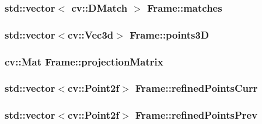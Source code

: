 \subsubsection[{\texorpdfstring{matches}{matches}}]{\setlength{\rightskip}{0pt plus 5cm}std\+::vector$<$ cv\+::\+D\+Match $>$ Frame\+::matches}\hypertarget{classFrame_ac7224127d7700699319bc8a8e84bef23}{}\label{classFrame_ac7224127d7700699319bc8a8e84bef23}
\subsubsection[{\texorpdfstring{points3D}{points3D}}]{\setlength{\rightskip}{0pt plus 5cm}std\+::vector$<$cv\+::\+Vec3d$>$ Frame\+::points3D}\hypertarget{classFrame_a387c7eff30bc00e6375fd9efa5510d22}{}\label{classFrame_a387c7eff30bc00e6375fd9efa5510d22}
\subsubsection[{\texorpdfstring{projection\+Matrix}{projectionMatrix}}]{\setlength{\rightskip}{0pt plus 5cm}cv\+::\+Mat Frame\+::projection\+Matrix}\hypertarget{classFrame_acc5cd57f6b94c159a2f80ff6416dfb25}{}\label{classFrame_acc5cd57f6b94c159a2f80ff6416dfb25}
\subsubsection[{\texorpdfstring{refined\+Points\+Curr}{refinedPointsCurr}}]{\setlength{\rightskip}{0pt plus 5cm}std\+::vector$<$cv\+::\+Point2f$>$ Frame\+::refined\+Points\+Curr}\hypertarget{classFrame_aee50f053bed60891e4582e3a478bcc1d}{}\label{classFrame_aee50f053bed60891e4582e3a478bcc1d}
\subsubsection[{\texorpdfstring{refined\+Points\+Prev}{refinedPointsPrev}}]{\setlength{\rightskip}{0pt plus 5cm}std\+::vector$<$cv\+::\+Point2f$>$ Frame\+::refined\+Points\+Prev}\hypertarget{classFrame_a548f00afc5984a717684cc2916c0bd4c}{}\label{classFrame_a548f00afc5984a717684cc2916c0bd4c}

